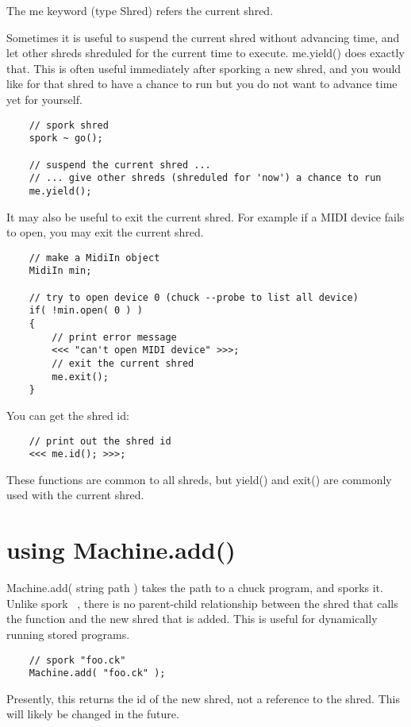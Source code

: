 The me keyword (type Shred) refers the current shred.

Sometimes it is useful to suspend the current shred without advancing time, and let other shreds shreduled for the current time to execute.  me.yield() does exactly that. This is often useful immediately after sporking a new shred, and you would like for that shred to have a chance to run but you do not want to advance time yet for yourself.
\begin{verbatim}
    // spork shred
    spork ~ go();

    // suspend the current shred ...
    // ... give other shreds (shreduled for 'now') a chance to run
    me.yield();
\end{verbatim}

It may also be useful to exit the current shred. For example if a MIDI device fails to open, you may exit the current shred.
\begin{verbatim}
    // make a MidiIn object
    MidiIn min;

    // try to open device 0 (chuck --probe to list all device)
    if( !min.open( 0 ) )
    {
        // print error message
        <<< "can't open MIDI device" >>>;
        // exit the current shred
        me.exit();
    }
\end{verbatim}

You can get the shred id:
\begin{verbatim}
    // print out the shred id
    <<< me.id(); >>>;
\end{verbatim}

These functions are common to all shreds, but yield() and exit() are commonly used with the current shred.
 
\section{using Machine.add()}

Machine.add( string path ) takes the path to a chuck program, and sporks it. Unlike spork ~, there is no parent-child relationship between the shred that calls the function and the new shred that is added. This is useful for dynamically running stored programs.
\begin{verbatim}
    // spork "foo.ck"
    Machine.add( "foo.ck" );
\end{verbatim}

Presently, this returns the id of the new shred, not a reference to the shred. This will likely be changed in the future.

